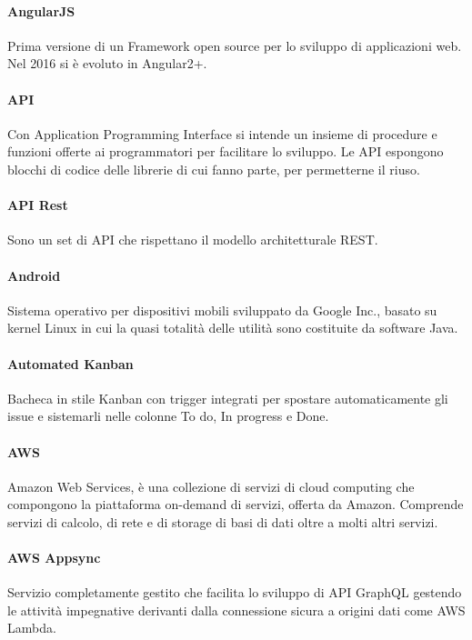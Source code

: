 \documentclass[]{article}
\begin{document}
	\paragraph*{AngularJS}
	Prima versione di un Framework open source per lo sviluppo di applicazioni web. Nel 2016 si è evoluto in Angular2+.

	\paragraph*{API}
	Con Application Programming Interface si intende un insieme di procedure e funzioni offerte ai programmatori per facilitare lo sviluppo. Le API espongono blocchi di codice delle librerie di cui fanno parte, per permetterne il riuso.

	\paragraph*{API Rest}
	Sono un set di API che rispettano il modello architetturale REST.

	\paragraph*{Android}
	Sistema operativo per dispositivi mobili sviluppato da Google Inc., basato su kernel Linux in cui la quasi totalità delle utilità sono costituite da software Java.

	\paragraph*{Automated Kanban}
	Bacheca in stile Kanban con trigger integrati per spostare automaticamente gli issue e sistemarli nelle colonne To do, In progress e Done.

	\paragraph*{AWS}
	Amazon Web Services, è una collezione di servizi di cloud computing che compongono la piattaforma on-demand di servizi, offerta da Amazon.	Comprende servizi di calcolo, di rete e di storage di basi di dati oltre a molti altri servizi.

	\paragraph*{AWS Appsync}
	Servizio completamente gestito che facilita lo sviluppo di API GraphQL gestendo le attività impegnative derivanti dalla connessione sicura a origini dati come AWS Lambda.
\end{document}
